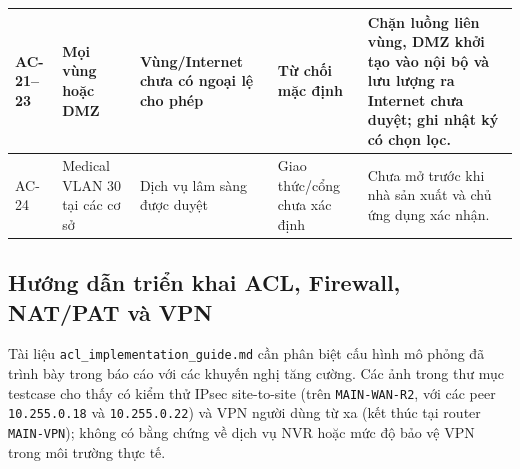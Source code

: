 \begin{small}
\begin{longtable}{|p{1.3cm}|p{2.9cm}|p{3.0cm}|p{2.2cm}|p{4.2cm}|}
AC-21--23 & Mọi vùng hoặc DMZ & Vùng/Internet chưa có ngoại lệ cho phép & Từ chối mặc định & Chặn luồng liên vùng, DMZ khởi tạo vào nội bộ và lưu lượng ra Internet chưa duyệt; ghi nhật ký có chọn lọc. \\ \hline
AC-24 & Medical VLAN 30 tại các cơ sở & Dịch vụ lâm sàng được duyệt & Giao thức/cổng chưa xác định & Chưa mở trước khi nhà sản xuất và chủ ứng dụng xác nhận. \\ \hline
\end{longtable}
\end{small}

\subsection{Hướng dẫn triển khai ACL, Firewall, NAT/PAT và VPN}
Tài liệu \texttt{acl\_implementation\_guide.md} cần phân biệt cấu hình mô phỏng đã trình bày trong báo cáo với các khuyến nghị tăng cường. Các ảnh trong thư mục testcase cho thấy có kiểm thử IPsec site-to-site (trên \texttt{MAIN-WAN-R2}, với các peer \texttt{10.255.0.18} và \texttt{10.255.0.22}) và VPN người dùng từ xa (kết thúc tại router \texttt{MAIN-VPN}); không có bằng chứng về dịch vụ NVR hoặc mức độ bảo vệ VPN trong môi trường thực tế.

